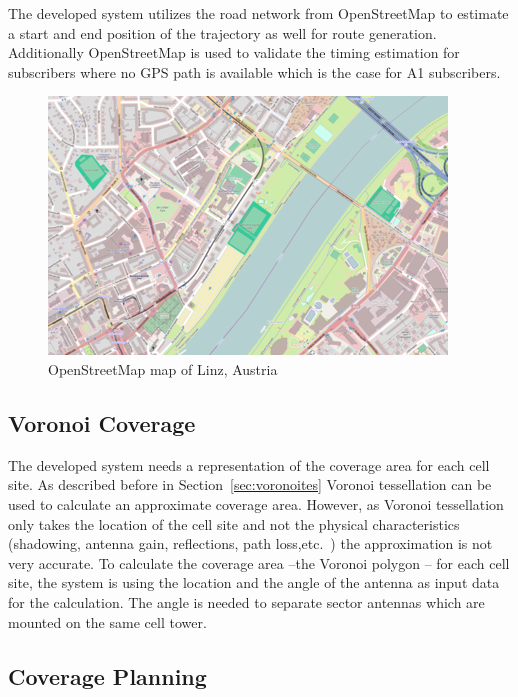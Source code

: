 \documentclass[master,english]{hgbthesis}
\begin{document}
The developed system utilizes the road network from OpenStreetMap to estimate a start and end position of the trajectory as well for route generation. Additionally OpenStreetMap is used to validate the timing estimation for subscribers where no GPS path is available which is the case for A1 subscribers. 

\begin{figure}

	\centering

	\includegraphics[width=0.7\linewidth]{./images/map_linz.png}

	\caption{OpenStreetMap map of Linz, Austria}

	\label{fig:map_linz}

\end{figure}

\subsection{Voronoi Coverage}

The developed system needs a representation of the coverage area for each cell site. As described before in Section~\ref{sec:voronoites} Voronoi tessellation can be used to calculate an approximate coverage area. However, as Voronoi tessellation only takes the location of the cell site and not the physical characteristics (shadowing, antenna gain, reflections, path loss,etc.\ ) the approximation is not very accurate. To calculate the coverage area --the Voronoi polygon -- for each cell site, the system is using the location and the angle of the antenna as input data for the calculation. The angle is needed to separate sector antennas which are mounted on the same cell tower.

\subsection{Coverage Planning}
\end{document}

